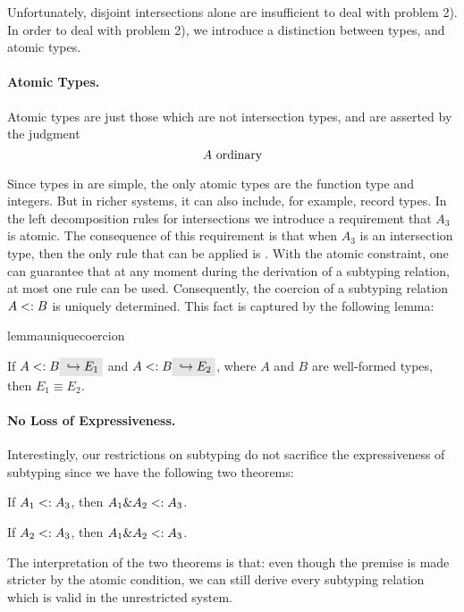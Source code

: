 Unfortunately, disjoint intersections alone are insufficient to deal with
problem 2). In order to deal with problem 2), we introduce a distinction between
types, and atomic types.

\paragraph{Atomic Types.} Atomic types are just those which are not intersection
types, and are asserted by the judgment \[ A \ \textnormal{ordinary} \]

Since types in \name are simple, the only atomic types are the
function type and integers.
But in richer systems, it can also include, for example, record types.
In the left decomposition rules for intersections we introduce a requirement
that $A_3$ is atomic. The consequence of this requirement is that when $A_3$ is
an intersection type, then the only rule that can be applied is
. With the atomic constraint, one can guarantee that at
any moment during the derivation of a subtyping relation, at most one rule can
be used. Consequently, the coercion of a subtyping relation $A <: B$ is
uniquely determined. This fact is captured by the following lemma:

\begin{restatable}{lemma}{uniquecoercion}
  \label{lemma:unique-coercion}

  If $A \subtype B \yields {E_1}$ and $A \subtype B \yields {E_2}$, where $A$
  and $B$ are well-formed types, then $E_1 \equiv E_2$.
\end{restatable}

\paragraph{No Loss of Expressiveness.}
Interestingly, our restrictions on subtyping do not sacrifice the expressiveness of
subtyping since we have the following two theorems:
\begin{theorem}
  If $A_1 <: A_3$, then $A_1 \& A_2 <: A_3$.
\end{theorem}
\begin{theorem}
If $A_2 <: A_3$, then $A_1 \& A_2 <: A_3$.
\end{theorem}

\noindent The interpretation of the two theorems is that: even though the
premise is made stricter by the atomic condition, we can still derive every
subtyping relation which is valid in the unrestricted system.


